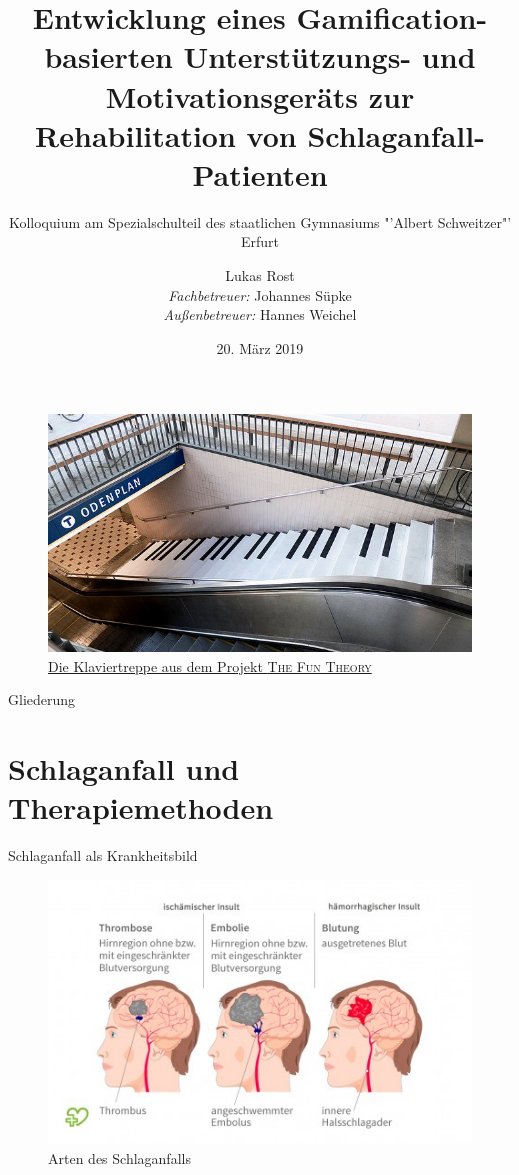 \documentclass[hyphens]{beamer}
\begin{document}
  \title[Gerät zur Schlaganfall-Rehabilitation]{\LARGE{Entwicklung eines Gamification-basierten Unterstützungs- und Motivationsgeräts zur Rehabilitation von Schlaganfall-Patienten}}
  \subtitle{Kolloquium am Spezialschulteil des staatlichen Gymnasiums "'Albert Schweitzer"' Erfurt}
  \author[Lukas Rost]{Lukas Rost \\ \emph{Fachbetreuer:} Johannes Süpke \\ \emph{Außenbetreuer:} Hannes Weichel}
  \date{20. März 2019}


 \titlepage
 
 \begin{frame}
 \begin{figure}
 	\includegraphics[scale=0.5]{pics/pianostairs}
 	\caption{\href{https://www.youtube.com/watch?v=SByymar3bds}{Die Klaviertreppe aus dem Projekt \textsc{The Fun Theory}}}
 \end{figure}
\end{frame}

 
 \titlepage

 \begin{frame}{Gliederung}
 \tableofcontents
 \end{frame}

\section{Schlaganfall und Therapiemethoden}

\begin{frame}{Schlaganfall als Krankheitsbild}
\begin{figure}
	\includegraphics[scale=0.15]{pics/sentst}
	\caption{Arten des Schlaganfalls}
\end{figure}
\end{frame}
\end{document}
